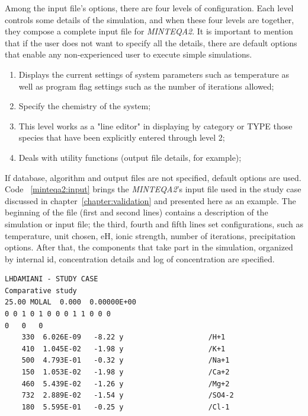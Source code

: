 Among the input file's options, there are four levels of configuration. Each level controls some details of the simulation, and when these four levels are together, they compose a complete input file for \emph{MINTEQA2}. It is important to mention that if the user does not want to specify all the details, there are default options that enable any non-experienced user to execute simple simulations.
\begin{enumerate}
\item Displays the current settings of system parameters such as temperature as well as program flag settings such as the number of iterations allowed;
\item Specify the chemistry of the system;
\item This level works as a "line editor" in displaying by category or TYPE those species that have been explicitly entered through level 2;
\item Deals with utility functions (output file details, for example);
\end{enumerate}

If database, algorithm and output files are not specified, default options are used. Code ~\ref{minteqa2:input}  brings the \emph{MINTEQA2}'s input file used in the study case discussed in chapter~\ref{chapter:validation} and presented here as an example. The beginning of the file (first and second lines) contains a description of the simulation or input file; the third, fourth and fifth lines set configurations, such as temperature, unit chosen, eH, ionic strength, number of iterations, precipitation options. After that, the components that take part in the simulation, organized by internal id, concentration details and log of concentration are specified.

\begin{minipage}[c]{0.92\textwidth}
\begin{lstlisting}[frame=single, caption=\emph{MINTEQA2}'s input file, label=minteqa2:input]
LHDAMIANI - STUDY CASE
Comparative study           
25.00 MOLAL  0.000  0.00000E+00
0 0 1 0 1 0 0 0 1 1 0 0 0
0   0   0
    330  6.026E-09   -8.22 y                    /H+1               
    410  1.045E-02   -1.98 y                    /K+1               
    500  4.793E-01   -0.32 y                    /Na+1              
    150  1.053E-02   -1.98 y                    /Ca+2              
    460  5.439E-02   -1.26 y                    /Mg+2              
    732  2.889E-02   -1.54 y                    /SO4-2             
    180  5.595E-01   -0.25 y                    /Cl-1              

\end{lstlisting}
\end{minipage}



